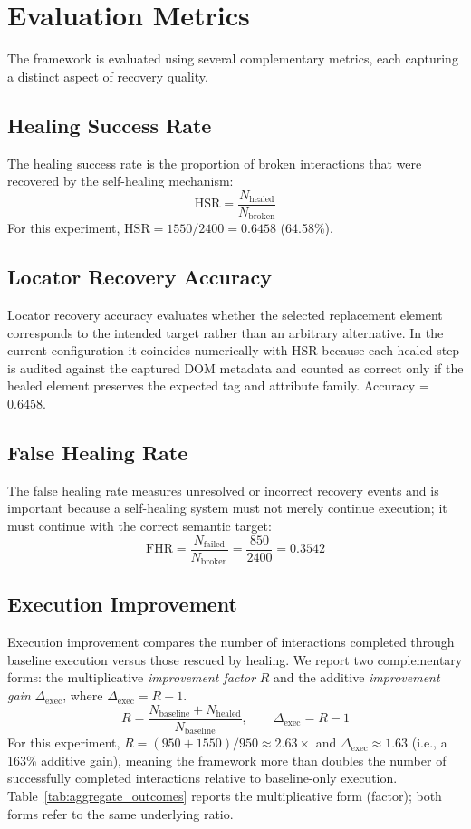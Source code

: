 \documentclass[conference]{IEEEtran}
\begin{document}
\section{Evaluation Metrics}
\label{sec:metrics}
The framework is evaluated using several complementary metrics, each capturing a distinct aspect of recovery quality.

\subsection{Healing Success Rate}
The healing success rate is the proportion of broken interactions that were recovered by the self-healing mechanism:
\[
\mathrm{HSR} = \frac{N_{\text{healed}}}{N_{\text{broken}}}
\]
For this experiment, $\mathrm{HSR} = 1550 / 2400 = 0.6458$ (64.58\%).

\subsection{Locator Recovery Accuracy}
Locator recovery accuracy evaluates whether the selected replacement element corresponds to the intended target rather than an arbitrary alternative. In the current configuration it coincides numerically with HSR because each healed step is audited against the captured DOM metadata and counted as correct only if the healed element preserves the expected tag and attribute family. Accuracy = 0.6458.

\subsection{False Healing Rate}
The false healing rate measures unresolved or incorrect recovery events and is important because a self-healing system must not merely continue execution; it must continue with the correct semantic target:
\[
\mathrm{FHR} = \frac{N_{\text{failed}}}{N_{\text{broken}}} = \frac{850}{2400} = 0.3542
\]

\subsection{Execution Improvement}
Execution improvement compares the number of interactions completed through baseline execution versus those rescued by healing. We report two complementary forms: the multiplicative \emph{improvement factor} $R$ and the additive \emph{improvement gain} $\Delta_{\text{exec}}$, where $\Delta_{\text{exec}} = R - 1$.
\[
R = \frac{N_{\text{baseline}} + N_{\text{healed}}}{N_{\text{baseline}}}, \qquad \Delta_{\text{exec}} = R - 1
\]
For this experiment, $R = (950 + 1550)/950 \approx 2.63\times$ and $\Delta_{\text{exec}} \approx 1.63$ (i.e., a 163\% additive gain), meaning the framework more than doubles the number of successfully completed interactions relative to baseline-only execution. Table~\ref{tab:aggregate_outcomes} reports the multiplicative form (factor); both forms refer to the same underlying ratio.
\end{document}

